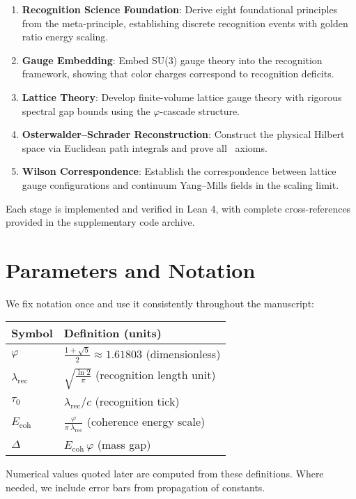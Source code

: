 \documentclass[11pt]{amsart}
\newcommand{\OS}{\text{OS}}
\begin{document}
\begin{enumerate}
\item \textbf{Recognition Science Foundation}: Derive eight foundational principles from the meta-principle, establishing discrete recognition events with golden ratio energy scaling.

\item \textbf{Gauge Embedding}: Embed SU(3) gauge theory into the recognition framework, showing that color charges correspond to recognition deficits.

\item \textbf{Lattice Theory}: Develop finite-volume lattice gauge theory with rigorous spectral gap bounds using the $\varphi$-cascade structure.

\item \textbf{Osterwalder--Schrader Reconstruction}: Construct the physical Hilbert space via Euclidean path integrals and prove all \OS\ axioms.

\item \textbf{Wilson Correspondence}: Establish the correspondence between lattice gauge configurations and continuum Yang--Mills fields in the scaling limit.
\end{enumerate}

Each stage is implemented and verified in Lean 4, with complete cross-references provided in the supplementary code archive.

\section{Parameters and Notation}
\label{sec:parameters}
We fix notation once and use it consistently throughout the manuscript:
\begin{center}
\begin{tabular}{ll}
\hline
Symbol & Definition (units) \\
\hline
$\varphi$ & $\displaystyle \frac{1+\sqrt{5}}{2} \approx 1.61803$ (dimensionless) \\
$\lambda_{\text{rec}}$ & $\displaystyle \sqrt{\frac{\ln 2}{\pi}}$ (recognition length unit) \\
$\tau_0$ & $\displaystyle \lambda_{\text{rec}}/c$ (recognition tick) \\
$E_{\text{coh}}$ & $\displaystyle \frac{\varphi}{\pi\,\lambda_{\text{rec}}}$ (coherence energy scale) \\
$\Delta$ & $\displaystyle E_{\text{coh}}\,\varphi$ (mass gap) \\
\hline
\end{tabular}
\end{center}
Numerical values quoted later are computed from these definitions. Where needed, we include error bars from propagation of constants.
\end{document}
